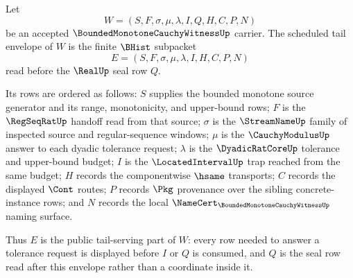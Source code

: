 \begin{definition}
\label{def:bounded-monotone-cauchy-witness-scheduled-tail-envelope}
Let
$$
W=(S,F,\sigma,\mu,\lambda,I,Q,H,C,P,N)
$$
be an accepted $\BoundedMonotoneCauchyWitnessUp$ carrier. The scheduled tail envelope of $W$ is the finite $\BHist$ subpacket
$$
E=(S,F,\sigma,\mu,\lambda,I,H,C,P,N)
$$
read before the $\RealUp$ seal row $Q$.

Its rows are ordered as follows: $S$ supplies the bounded monotone source generator and its range, monotonicity, and upper-bound rows; $F$ is the $\RegSeqRatUp$ handoff read from that source; $\sigma$ is the $\StreamNameUp$ family of inspected source and regular-sequence windows; $\mu$ is the $\CauchyModulusUp$ answer to each dyadic tolerance request; $\lambda$ is the $\DyadicRatCoreUp$ tolerance and upper-bound budget; $I$ is the $\LocatedIntervalUp$ trap reached from the same budget; $H$ records the componentwise $\hsame$ transports; $C$ records the displayed $\Cont$ routes; $P$ records $\Pkg$ provenance over the sibling concrete-instance rows; and $N$ records the local $\NameCert_{\BoundedMonotoneCauchyWitnessUp}$ naming surface.

Thus $E$ is the public tail-serving part of $W$: every row needed to answer a tolerance request is displayed before $I$ or $Q$ is consumed, and $Q$ is the seal row read after this envelope rather than a coordinate inside it.
\end{definition}

